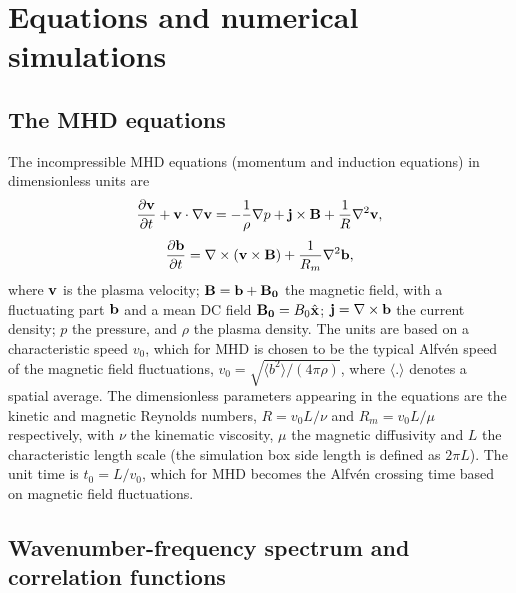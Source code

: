 \documentclass[aip,pop,reprint,amsmath,amssymb,floatfix]{revtex4-1}
\let\oldhat\hat
\renewcommand{\hat}[1]{\oldhat{\mathbf{#1}}}
\begin{document}
\section{Equations and numerical simulations}\label{sec_EqNumSim}

\subsection{The MHD equations}\label{sec_eq}

The incompressible MHD equations (momentum and induction
equations) in dimensionless units are
\begin{equation}\label{eq:MHD_v}
  \frac {\partial {\bf v}}{\partial t} +
  {\bf v }\cdot \nabla {\bf v} = -\frac{1}{\rho}\nabla p +
  {\bf j} \times {\bf B} + \frac{1}{R} \nabla^2{\bf v},
\end{equation}
\begin{equation}\label{eq:MHD_b}
  \frac{\partial {\bf b}}{\partial t} = \nabla \times ({\bf v} \times {\bf B})
  + \frac{1}{R_m} \nabla^2 {\bf b},
\end{equation}
where ${\bf v}$ is the plasma velocity; ${\bf B} = {\bf b} + {\bf
  B_0}$ the magnetic field, with a fluctuating part ${\bf b}$ and a
mean DC field ${\bf B_0}=B_0\hat{x}$; ${\bf j} = \nabla \times {\bf b}$ the
current density; $p$ the pressure, and $\rho$ the plasma density.  The
units are based on a characteristic speed $v_0$, which for MHD is
chosen to be the typical Alfv\'en speed of the magnetic field
fluctuations, $v_0 = \sqrt{\langle b^2 \rangle /(4\pi\rho)}$,
where $\langle . \rangle$ denotes a spatial average. The dimensionless
parameters appearing in the equations are the kinetic and magnetic
Reynolds numbers, $R=v_0 L/\nu$ and $R_m = v_0 L /\mu$ respectively, with $\nu$ the
kinematic viscosity, $\mu$ the magnetic diffusivity and $L$ the
characteristic length scale (the simulation box side length is defined
as $2\pi L$). The unit time is $t_0 = L/v_0$, which for MHD becomes
the Alfv\'en crossing time based on magnetic field fluctuations.


\subsection{Wavenumber-frequency spectrum and correlation functions}\label{sec_Wfspectrum_and_Gamma}
\end{document}
